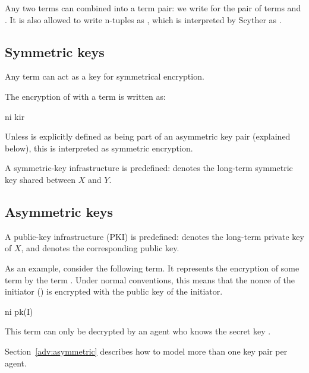\documentclass{book}
\begin{document}
Any two terms can combined into a term pair: we write  for
the pair of terms  and . It is also allowed to write
n-tuples as , which is interpreted by Scyther as .

\subsection{Symmetric keys}

Any term can act as a key for symmetrical encryption.

The encryption of  with a term  is written as:
\begin{spdl}
{ ni }kir
\end{spdl}

Unless  is explicitly defined as being part of an asymmetric
key pair (explained below), this is interpreted as symmetric encryption.

A symmetric-key infrastructure is predefined:
 denotes the long-term symmetric key shared between $X$ and $Y$.

\subsection{Asymmetric keys}

A public-key infrastructure (PKI) is predefined:
 denotes the long-term private key of $X$, and 
denotes the corresponding public key.

\begin{example}

As an example, consider the following term. It represents the encryption
of some term  by the term . Under normal conventions,
this means that the nonce of the initiator () is encrypted with
the public key of the initiator.

\begin{spdl}
{ ni }pk(I)
\end{spdl}

This term can only be decrypted by an agent who knows the secret key
.

\end{example}

Section~\ref{adv:asymmetric} describes how to model more than one key
pair per agent.
\end{document}
